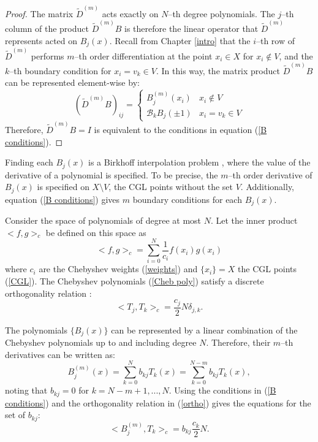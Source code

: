 \documentclass{sfuthesis}
\begin{document}
\begin{proof}
The matrix $\tilde{D}^{(m)}$ acts exactly on $N$--th degree polynomials.
The $j$--th column of the product $\tilde{D}^{(m)} B$ is therefore the linear operator that $\tilde{D}^{(m)}$ represents acted on $B_j(x)$.
Recall from Chapter \ref{intro} that the $i$--th row of $\tilde{D}^{(m)}$ performs $m$--th order differentiation at the point $x_i \in X$
for $x_i \notin V$, and the $k$--th boundary condition for $x_i = v_k \in V$.
In this way, the matrix product $\tilde{D}^{(m)} B$ can be represented element-wise by:
\begin{equation}
(\tilde{D}^{(m)} B)_{ij} = \begin{cases} B^{(m)}_j(x_i) & x_i \notin V \\ \mathcal{B}_k B_j(\pm 1) & x_i = v_k \in V \end{cases}
\end{equation}
Therefore, $\tilde{D}^{(m)} B = I$ is equivalent to the conditions in equation (\ref{B conditions}).
\end{proof}

Finding each $B_j(x)$ is a Birkhoff interpolation problem \cite{birkhoff1906,schoenberg1966hb}, where the value of the derivative of a polynomial is specified.
To be precise, the $m$--th order derivative of $B_j(x)$ is specified on $X \setminus V$, the CGL points without the set $V$.
Additionally, equation (\ref{B conditions}) gives $m$ boundary conditions for each $B_j(x)$.

Consider the space of polynomials of degree at most $N$.
Let the inner product $<f,g>_c$ be defined on this space as
\begin{equation}
<f,g>_c = \sum_{i=0}^N \frac{1}{c_i} f(x_i) g(x_i)
\end{equation}
where $c_i$ are the Chebyshev weights (\ref{weights}) and $\{ x_i \} = X$ the CGL points (\ref{CGL}).
The Chebyshev polynomials (\ref{Cheb poly}) satisfy a discrete orthogonality relation \cite{peyret2002spectral}:
\begin{equation} \label{ortho}
<T_j,T_k>_c = \frac{c_j}{2} N \delta_{j,k}.
\end{equation}

The polynomials $\{ B_j(x) \}$ can be represented by a linear combination of the Chebyshev polynomials up to and including degree $N$.
Therefore, their $m$--th derivatives can be written as:
\begin{equation}
B_j^{(m)}(x) = \sum_{k=0}^N b_{kj} T_k(x) = \sum_{k=0}^{N-m} b_{kj} T_k(x),
\end{equation}
noting that $b_{kj} = 0$ for $k = N - m +1, ... , N$.
Using the conditions in (\ref{B conditions}) and the orthogonality relation in (\ref{ortho}) gives the equations for the set of $b_{kj}$:
\begin{equation}
<B_j^{(m)}, T_k>_c = b_{kj} \frac{c_k}{2} N.
\end{equation}
\end{document}
